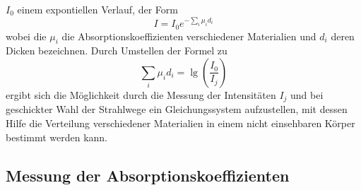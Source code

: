 $I_0$ einem expontiellen Verlauf, der Form
\begin{equation}
  I=I_0e^{-\sum_i\mu_id_i}
\end{equation}
wobei die $\mu_i$ die Absorptionskoeffizienten verschiedener Materialien und
$d_i$ deren Dicken bezeichnen. Durch Umstellen der Formel zu
\begin{equation}
  \sum_i\mu_id_i=\lg\left(\frac{I_0}{I_j}\right)
\end{equation}
ergibt sich die Möglichkeit durch die Messung der Intensitäten $I_j$ und bei
geschickter Wahl der Strahlwege ein Gleichungssystem aufzustellen, mit dessen
Hilfe die Verteilung verschiedener Materialien in einem nicht einsehbaren Körper
bestimmt werden kann.

\subsection{Messung der Absorptionskoeffizienten}
